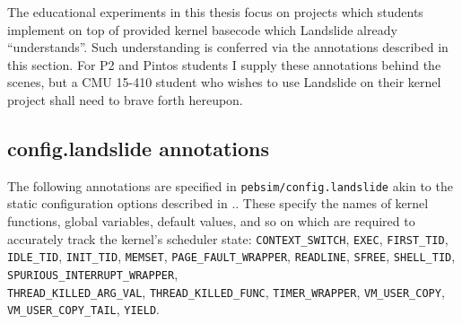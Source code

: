 The educational experiments in this thesis focus on projects which students implement on top of provided kernel basecode which Landslide already ``understands''.
Such understanding is conferred via the annotations described in this section.
For P2 and Pintos students I supply these annotations behind the scenes,
but a CMU 15-410 student who wishes to use Landslide on their kernel project shall need to brave forth hereupon.


\subsection{config.landslide annotations}
\label{sec:landslide-config-landslide}

The following annotations are specified in {\tt pebsim/config.landslide} akin to the static configuration options
described in \sect{\ref{sec:landslide-directly}}..
These specify the names of kernel functions, global variables, default values, and so on
which are required to accurately track the kernel's scheduler state:
{\tt CONTEXT\_SWITCH},
{\tt EXEC},
{\tt FIRST\_TID},
{\tt IDLE\_TID},
{\tt INIT\_TID},
{\tt MEMSET},
{\tt PAGE\_FAULT\_WRAPPER},
{\tt READLINE},
{\tt SFREE},
{\tt SHELL\_TID},
{\tt SPURIOUS\_INTERRUPT\_WRAPPER},
\\
{\tt THREAD\_KILLED\_ARG\_VAL},
{\tt THREAD\_KILLED\_FUNC},
{\tt TIMER\_WRAPPER},
{\tt VM\_USER\_COPY},
\\
{\tt VM\_USER\_COPY\_TAIL},
{\tt YIELD}.

